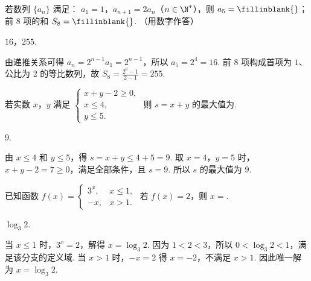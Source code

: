 \begin{problem}
若数列 \(\{a_{n}\}\) 满足： \(a_{1} = 1\)，\(a_{n+1} = 2a_{n}\)（\(n \in \N^*\)），则 \(a_{5} =\fillinblank{}\)；前 8 项的和 \(S_{8} =\fillinblank{}\). （用数字作答）
\begin{answer}
\(16\)，\(255\).
\end{answer}

\begin{solution}
由递推关系可得 \(a_n=2^{n-1}a_1=2^{n-1}\)，所以 \(a_5=2^4=16\). 前 8 项构成首项为 \(1\)、公比为 \(2\) 的等比数列，故 \(S_8=\frac{2^8-1}{2-1}=255\).
\end{solution}
\end{problem}

\begin{problem}
若实数 \(x\)，\(y\) 满足 \(\begin{cases}
x + y - 2 \geqslant 0,\\
x \leqslant 4,\\
y \leqslant 5.
\end{cases}\) 则 \(s = x + y\) 的最大值为\fillinblank{}.
\begin{answer}
\(9\).
\end{answer}

\begin{solution}
由 \(x\leqslant4\) 和 \(y\leqslant5\)，得 \(s=x+y\leqslant4+5=9\). 取 \(x=4\)，\(y=5\) 时，\(x+y-2=7\geqslant0\)，满足全部条件，且 \(s=9\). 所以 \(s\) 的最大值为 \(9\).
\end{solution}
\end{problem}

\begin{problem}
已知函数 \( f(x) = \begin{cases}
3^x, & x \leqslant 1,\\
-x, & x > 1.
\end{cases} \) 若 \( f(x) = 2 \)，则 \( x = \)\fillinblank{}.
\begin{answer}
\(\log_{3}2\).
\end{answer}

\begin{solution}
当 \(x\leqslant1\) 时，\(3^x=2\)，解得 \(x=\log_3 2\). 因为 \(1<2<3\)，所以 \(0<\log_3 2<1\)，满足该分支的定义域. 当 \(x>1\) 时，\(-x=2\) 得 \(x=-2\)，不满足 \(x>1\). 因此唯一解为 \(x=\log_3 2\).
\end{solution}
\end{problem}

